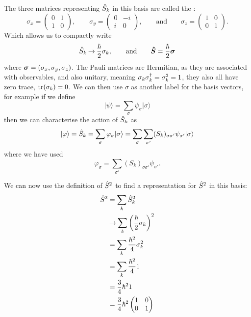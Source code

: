 \documentclass[a4paper]{article}
\renewcommand{\ket}[1]{\vert {#1} \rangle}
\renewcommand{\ident}{1}
\newcommand{\vecoperator}[1]{\vv{\operator{#1}}}
\newcommand{\representation}{\mathbin{\rightarrow}}
\theoremstyle{definition}
\begin{document}
    The three matrices representing \(\hat{S}_k\) in this basis are called the :
    \[
        \sigma_x =
        \begin{pmatrix}
            0 & 1\\
            1 & 0
        \end{pmatrix}
        ,\qquad \sigma_y =
        \begin{pmatrix}
            0 & -i\\
            i & 0
        \end{pmatrix}
        ,\qquad\text{and}\qquad \sigma_z = 
        \begin{pmatrix}
            1 & 0\\
            0 & 1
        \end{pmatrix}
        .
    \]
    Which allows us to compactly write
    \[\operator{S}_k \representation \frac{\hbar}{2}\sigma_k, \qquad\text{and}\qquad \vecoperator{S} = \frac{\hbar}{2}\vv{\sigma}\]
    where \(\bm{\sigma} = (\sigma_x, \sigma_y, \sigma_z)\).
    The Pauli matrices are Hermitian, as they are associated with observables, and also unitary, meaning \(\sigma_k\sigma_k\hermit = \sigma_k^2 = \ident\), they also all have zero trace, \(\tr(\sigma_k) = 0\).
    We can then use \(\sigma\) as another label for the basis vectors, for example if we define
    \[\ket{\psi} = \sum_{\sigma} \psi_\sigma\ket{\sigma}\]
    then we can characterise the action of \(\hat{S}_k\) as
    \[\ket{\varphi} = \operator{S}_k = \sum_\sigma \varphi_\sigma\ket{\sigma} = \sum_\sigma\sum_{\sigma'}(S_k)_{\sigma\sigma'}\psi_{\sigma'}\ket{\sigma}\]
    where we have used
    \[\varphi_\sigma = \sum_{\sigma'}(S_k)_{\sigma\sigma'}\psi_{\sigma'}.\]
    
    We can now use the definition of \(\hat{S}^2\) to find a representation for \(\hat{S}^2\) in this basis:
    \begin{align*}
        \operator{S}^2 &= \sum_k \operator{S}_k^2\\
        &\representation \sum_k \left(\frac{\hbar}{2}\sigma_k\right)^2\\
        &= \sum_k \frac{\hbar^2}{4}\sigma_k^2\\
        &= \sum_k \frac{\hbar^2}{4}\ident\\
        &= \frac{3}{4}\hbar^2\ident\\
        &= \frac{3}{4}\hbar^2
        \begin{pmatrix}
            1 & 0\\
            0 & 1
        \end{pmatrix}
    \end{align*}
    
\end{document}
